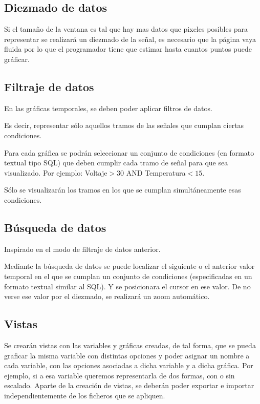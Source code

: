 \subsection{Diezmado de datos}

Si el tamaño de la ventana es tal que hay mas datos que pixeles posibles para representar se realizará un diezmado de la señal, es necesario que la página vaya fluida por lo que el programador tiene que estimar hasta cuantos puntos puede gráficar.


\subsection{Filtraje de datos}

En las gráficas temporales, se deben poder aplicar filtros de datos.

Es decir, representar sólo aquellos tramos de las señales que cumplan ciertas condiciones.

Para cada gráfica se podrán seleccionar un conjunto de condiciones (en formato textual tipo SQL) que deben cumplir cada tramo de señal para que sea visualizado. 
Por ejemplo:
Voltaje$>30$ AND Temperatura$<15$. 

Sólo se visualizarán los tramos en los que se cumplan simultáneamente esas condiciones.



\subsection{Búsqueda de datos}

Inspirado en el modo de filtraje de datos anterior. 

Mediante la búsqueda de datos se puede localizar el siguiente o el anterior valor temporal en el que se cumplan un conjunto de condiciones (especificadas en un formato textual similar al SQL). Y se posicionara el cursor en ese valor. De no verse ese valor por el diezmado, se realizará un zoom automático.


\subsection{Vistas}

Se crearán vistas con las variables y gráficas creadas, de tal forma, que se pueda graficar la misma variable con distintas opciones y poder asignar un nombre a cada variable, con las opciones asociadas a dicha variable y a dicha gráfica. Por ejemplo, si a esa variable queremos representarla de dos formas, con o sin escalado.
Aparte de la creación de vistas, se deberán poder exportar e importar independientemente de los ficheros que se apliquen.

